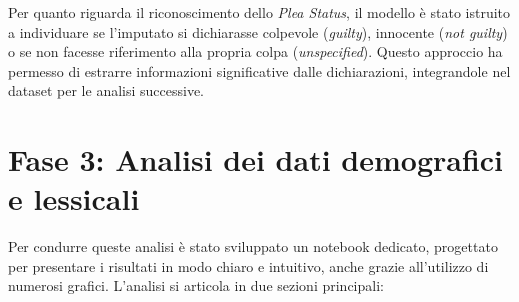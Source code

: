 \documentclass[11pt]{article}
\begin{document}
Per quanto riguarda il riconoscimento dello \textit{Plea Status}, il modello è stato istruito a individuare se l’imputato si dichiarasse colpevole (\textit{guilty}), innocente (\textit{not guilty}) o se non facesse riferimento alla propria colpa (\textit{unspecified}). Questo approccio ha permesso di estrarre informazioni significative dalle dichiarazioni, integrandole nel dataset per le analisi successive.

\section{Fase 3: Analisi dei dati demografici e lessicali}
Per condurre queste analisi è stato sviluppato un notebook dedicato, progettato per presentare i risultati in modo chiaro e intuitivo, anche grazie all’utilizzo di numerosi grafici. L’analisi si articola in due sezioni principali:
\end{document}

